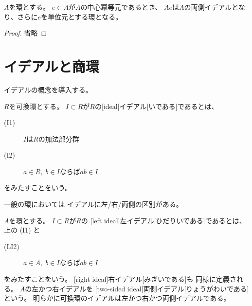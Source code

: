 \documentclass[report]{jlreq}
\begin{document}
\begin{proposition}[中心冪等元により生成される環]
    $A$を環とする。
    $e \in A$が$A$の中心冪等元であるとき、
    $Ae$は$A$の両側イデアルとなり、さらに$e$を単位元とする環となる。
\end{proposition}

\begin{proof}
    省略
\end{proof}

\begin{definition}[環準同型]
    \TODO{}
\end{definition}



%
\section{イデアルと商環}

イデアルの概念を導入する。

\begin{definition}[可換環のイデアル]
    $R$を可換環とする。
    $I \subset R$が$R$の[ideal]{イデアル}[いである]であるとは、
    \begin{description}
        \item[(I1)] $I$は$R$の加法部分群
        \item[(I2)] $a \in R,\; b \in I$ならば$ab \in I$
    \end{description}
    をみたすことをいう。
\end{definition}

一般の環においては
イデアルに左/右/両側の区別がある。

\begin{definition}[一般の環のイデアル]
    $A$を環とする。
    $I \subset R$が$R$の
    [left ideal]{左イデアル}[ひだりいである]であるとは、
    上の (I1) と
    \begin{description}
        \item[(LI2)] $a \in A,\; b \in I$ならば$ab \in I$
    \end{description}
    をみたすことをいう。
    [right ideal]{右イデアル}[みぎいである]も
    同様に定義される。
    $A$の左かつ右イデアルを
    [two-sided ideal]{両側イデアル}[りょうがわいである]
    という。
    明らかに可換環のイデアルは左かつ右かつ両側イデアルである。
\end{definition}
\end{document}
